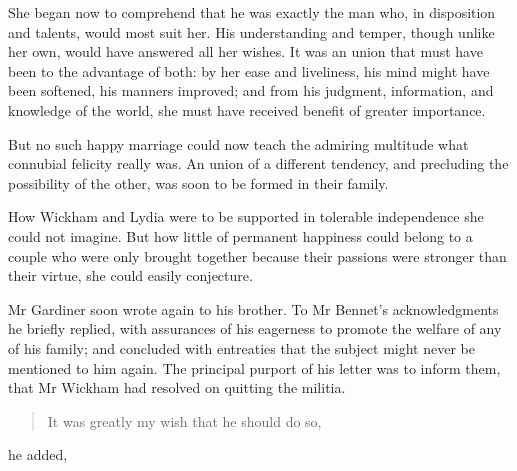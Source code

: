 She began now to comprehend that he was exactly the man who, in disposition and talents, would most suit her. His understanding and temper, though unlike her own, would have answered all her wishes. It was an union that must have been to the advantage of both: by her ease and liveliness, his mind might have been softened, his manners improved; and from his judgment, information, and knowledge of the world, she must have received benefit of greater importance.

But no such happy marriage could now teach the admiring multitude what connubial felicity really was. An union of a different tendency, and precluding the possibility of the other, was soon to be formed in their family.

How Wickham and Lydia were to be supported in tolerable independence she could not imagine. But how little of permanent happiness could belong to a couple who were only brought together because their passions were stronger than their virtue, she could easily conjecture.

Mr Gardiner soon wrote again to his brother. To Mr Bennet's acknowledgments he briefly replied, with assurances of his eagerness to promote the welfare of any of his family; and concluded with entreaties that the subject might never be mentioned to him again. The principal purport of his letter was to inform them, that Mr Wickham had resolved on quitting the militia.


\begin{quotation}

\noindent It was greatly my wish that he should do so,

\end{quotation}


 he added, 

